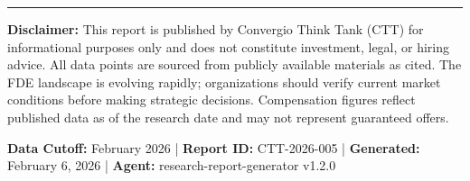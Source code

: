 \vspace{12pt}
\hrule
\vspace{6pt}
{\scriptsize\color{msgray}
\textbf{Disclaimer:} This report is published by Convergio Think Tank
(CTT) for informational purposes only and does not constitute
investment, legal, or hiring advice. All data points are sourced from
publicly available materials as cited. The FDE landscape is evolving
rapidly; organizations should verify current market conditions before
making strategic decisions. Compensation figures reflect published data
as of the research date and may not represent guaranteed offers.

\vspace{4pt}
\textbf{Data Cutoff:} February 2026 |
\textbf{Report ID:} CTT-2026-005 |
\textbf{Generated:} February 6, 2026 |
\textbf{Agent:} research-report-generator v1.2.0
}
